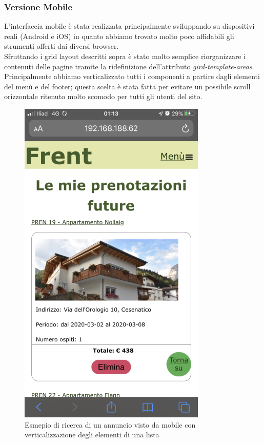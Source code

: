 \documentclass[1_relazione.tex]{subfiles}
\begin{document}
\subsubsection{Versione Mobile}
L'interfaccia mobile è stata realizzata principalmente sviluppando su dispositivi reali (Android e iOS) in quanto abbiamo trovato molto poco affidabili gli strumenti offerti dai diversi browser.\\
Sfruttando i grid layout descritti sopra è stato molto semplice riorganizzare i contenuti delle pagine tramite la ridefinizione dell'attributo \textit{gird-template-areas}.\\
Principalmente abbiamo verticalizzato tutti i componenti a partire dagli elementi del menù e del footer; questa scelta è stata fatta per evitare un possibile scroll orizzontale ritenuto molto scomodo per tutti gli utenti del sito.\\

\begin{figure}[h!]
    \centering
    \includegraphics[scale=0.4]{immagini/ricercaMobile.png}
    \caption{Esmepio di ricerca di un annuncio visto da mobile con verticalizzazione degli elementi di una lista}
\end{figure}
\end{document}
